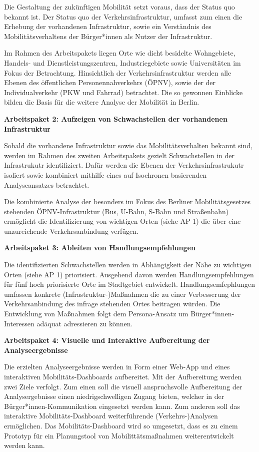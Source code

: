 Die Gestaltung der zukünftigen Mobilität setzt voraus, dass der Status quo bekannt ist. Der Status quo der Verkehrsinfrastruktur, umfasst zum einen die Erhebung der vorhandenen Infrastruktur, sowie ein Verständnis des Mobilitätsverhaltens der Bürger*innen als Nutzer der Infrastruktur. 

Im Rahmen des Arbeitspakets liegen Orte wie dicht besidelte Wohngebiete, Handels- und Dienstleistungszentren, Industriegebiete sowie Universitäten im Fokus der Betrachtung. Hinsichtlich der Verkehrsinfrastruktur werden alle Ebenen des öffentlichen Personennahverkehrs (ÖPNV), sowie der der Individualverkehr (PKW und Fahrrad) betrachtet. Die so gewonnen Einblicke bilden die Basis für die weitere Analyse der Mobilität in Berlin.

\textbf{Arbeitspaket 2: Aufzeigen von Schwachstellen der vorhandenen Infrastruktur}

Sobald die vorhandene Infrastruktur sowie das Mobilitätsverhalten bekannt sind, werden im Rahmen des zweiten Arbeitspakets gezielt Schwachstellen in der Infrastrukutr identifiziert. Dafür werden die  Ebenen der Verkehrsinfrastrukutr isoliert sowie kombiniert mithilfe eines auf Isochronen basierenden Analyseansatzes betrachtet. 

Die kombinierte Analyse der besonders im Fokus des Berliner Mobilitätsgesetzes stehenden ÖPNV-Infrastruktur (Bus, U-Bahn, S-Bahn und Straßenbahn) ermöglicht die Identifizierung von wichtigen Orten (siehe AP 1) die über eine unzureichende Verkehrsanbindung verfügen. 

\textbf{Arbeitspaket 3: Ableiten von Handlungsempfehlungen}

Die identifizierten Schwachstellen werden in Abhängigkeit der Nähe zu wichtigen Orten (siehe AP 1) priorisiert. Ausgehend davon werden Handlungsempfehlungen für fünf hoch priorisierte Orte im Stadtgebiet entwickelt. Handlungsemfephlungen umfassen konkrete (Infrastruktur-)Maßnahmen die zu einer Verbesserung der Verkehrsanbindung des infrage stehenden Ortes beitragen würden. Die Entwicklung von Maßnahmen folgt dem Persona-Ansatz um Bürger*innen-Interessen adäquat adressieren zu können.

\textbf{Arbeitspaket 4: Visuelle und Interaktive Aufbereitung der Analyseergebnisse}

Die erzielten Analyseergebnisse werden in Form einer Web-App und eines interaktiven Mobilitäts-Dashboards aufbereitet. Mit der Aufbereitung werden zwei Ziele verfolgt. Zum einen soll die visuell anspruchsvolle Aufbereitung der Analysergebnisse einen niedrigschwelligen Zugang bieten, welcher in der Bürger*innen-Kommunikation eingesetzt werden kann. Zum anderen soll das interaktive Mobilitäts-Dashboard weiterführende (Verkehrs-)Analysen ermöglichen. Das Mobilitäts-Dashboard wird so umgesetzt, dass es zu einem Prototyp für ein Planungstool von Mobilittätsmaßnahmen weiterentwickelt werden kann.

